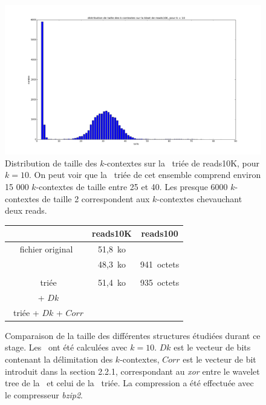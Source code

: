 \begin{figure}[!ht]
    \center
    \includegraphics[scale=0.3]{./images/distribReads10K_k10.png}
    \caption{Distribution de taille des $k$-contextes sur la \kbwt\ triée de reads10K, pour $k = 10$. On peut voir que la \kbwt\ triée de cet ensemble comprend environ 15 000 $k$-contextes de taille entre 25 et 40. Les presque 6000 $k$-contextes de taille 2 correspondent aux $k$-contextes chevauchant deux reads.}
    \label{tailleContextes}
\end{figure}

\begin{figure}
\begin{center}
\begin{tabular}{|c||c|c|}
	\hline
	 & reads10K & reads100\\ \hline \hline
	fichier original & 51,8~ko & \\ \hline
	\bwt & 48,3~ko & 941~octets\\ \hline
	\kbwt & & \\ \hline
	\kbwt\ triée & 51,4~ko & 935~octets \\ \hline
	\kbwt\ + $Dk$ & & \\ \hline
	\kbwt\ triée + $Dk$ + $Corr$ & & \\ \hline
\end{tabular}
\caption{Comparaison de la taille des différentes structures étudiées durant ce stage. Les \kbwt\ ont été calculées avec $k=10$. $Dk$ est le vecteur de bits contenant la délimitation des $k$-contextes, $Corr$ est le vecteur de bit introduit dans la section 2.2.1, correspondant au \textit{xor} entre le wavelet tree de la \kbwt\ et celui de la \kbwt\ triée. La compression a été effectuée avec le compresseur \textit{bzip2}.}
\label{struct}
\end{center}
\end{figure}

